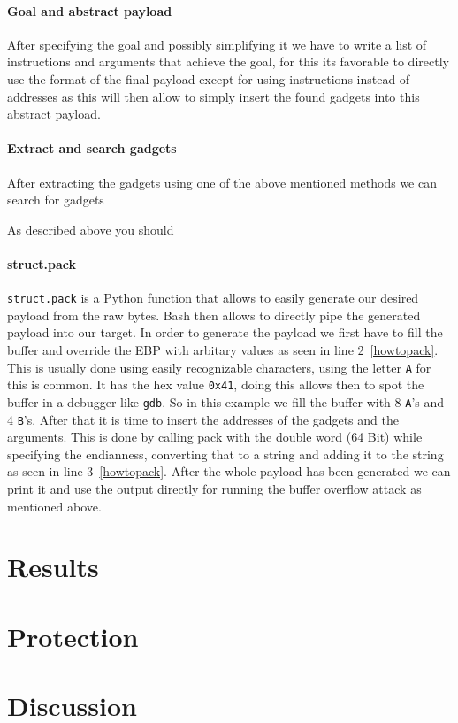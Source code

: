 \documentclass[journal=tosc,submission]{iacrtrans}
\begin{document}
\paragraph{Goal and abstract payload}
After specifying the goal and possibly simplifying it we have to write a list of instructions and arguments that achieve the goal, for this its favorable to directly use the format of the final payload except for using instructions instead of addresses as this will then allow to simply insert the found gadgets into this abstract payload.
\paragraph{Extract and search gadgets}
After extracting the gadgets using one of the above mentioned methods we can search for gadgets

As described above you should 

\paragraph{struct.pack}
\Verb+struct.pack+ is a Python function that allows to easily generate our desired payload from the raw bytes. Bash then allows to directly pipe the generated payload into our target. In order to generate the payload we first have to fill the buffer and override the EBP with arbitary values as seen in line 2~\cref{howtopack}. This is usually done using easily recognizable characters, using the letter \Verb+A+ for this is common. It has the hex value \Verb+0x41+, doing this allows then to spot the buffer in a debugger like \Verb+gdb+. So in this example we fill the buffer with 8 \Verb+A+'s and 4 \Verb+B+'s. After that it is time to insert the addresses of the gadgets and the arguments. This is done by calling pack with the double word (64 Bit) while specifying the endianness, converting that to a string and adding it to the string as seen in line 3~\cref{howtopack}. After the whole payload has been generated we can print it and use the output directly for running the buffer overflow attack as mentioned above.
\section{Results}

\section{Protection}

\section{Discussion}



\end{document}
